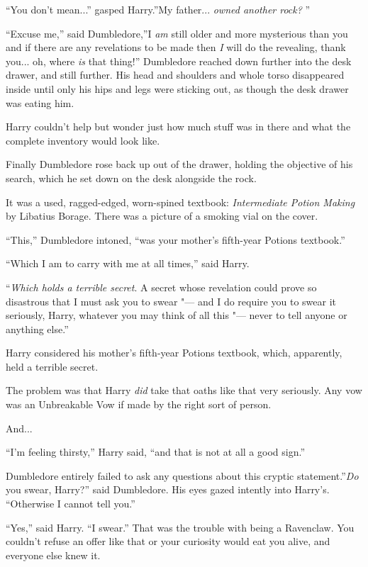 ``You don't mean...'' gasped Harry.''My father... \emph{owned
another rock?} ''

``Excuse me,'' said Dumbledore,''I \emph{am} still older and more
mysterious than you and if there are any revelations to be made then
\emph{I} will do the revealing, thank you... oh, where \emph{is}
that thing!'' Dumbledore reached down further into the desk drawer, and
still further. His head and shoulders and whole torso disappeared inside
until only his hips and legs were sticking out, as though the desk
drawer was eating him.

Harry couldn't help but wonder just how much stuff was in there and what
the complete inventory would look like.

Finally Dumbledore rose back up out of the drawer, holding the objective
of his search, which he set down on the desk alongside the rock.

It was a used, ragged-edged, worn-spined textbook: \emph{Intermediate
Potion Making} by Libatius Borage. There was a picture of a smoking vial
on the cover.

``This,'' Dumbledore intoned, ``was your mother's fifth-year Potions
textbook.''

``Which I am to carry with me at all times,'' said Harry.

``\emph{Which holds a terrible secret}. A secret whose revelation could
prove so disastrous that I must ask you to swear "--- and I do require you
to swear it seriously, Harry, whatever you may think of all this "--- never
to tell anyone or anything else.''

Harry considered his mother's fifth-year Potions textbook, which,
apparently, held a terrible secret.

The problem was that Harry \emph{did} take that oaths like that very
seriously. Any vow was an Unbreakable Vow if made by the right sort of
person.

And...

``I'm feeling thirsty,'' Harry said, ``and that is not at all a good
sign.''

Dumbledore entirely failed to ask any questions about this cryptic
statement.''\emph{Do} you swear, Harry?'' said Dumbledore. His eyes
gazed intently into Harry's. ``Otherwise I cannot tell you.''

``Yes,'' said Harry. ``I swear.'' That was the trouble with being a
Ravenclaw. You couldn't refuse an offer like that or your curiosity
would eat you alive, and everyone else knew it.

